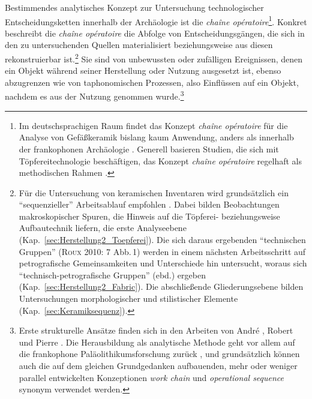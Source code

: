 \begin{multicols}{2}
Bestimmendes analytisches Konzept zur Untersuchung technologischer Entscheidungsketten innerhalb der Archäologie ist die \textit{\mbox{chaîne} opératoire}\footnote{Im deutschsprachigen Raum findet das Konzept \textit{\mbox{chaîne} opératoire} für die Analyse von Gefäßkeramik bislang kaum Anwendung, anders als innerhalb der frankophonen Archäologie \parencites[siehe][]{Gosselain.1992}{Huysecom.1994}{Visseyrais.2006}{Manem.2008}{Mayor.2011b}{Roux.2011}{Ard.2014}{Gomart.2014}. Generell basieren Studien, die sich mit Töpfereitechnologie beschäftigen, das Konzept \textit{\mbox{chaîne} opératoire} regelhaft als methodischen Rahmen \parencites[siehe][]{vanderLeeuw.1993}{PeuramakiBrown.2004}{Berg.2007}{Berg.2011}{Berg.2017}{DeLaFuente.2011}.}. Konkret beschreibt die \textit{\mbox{chaîne} opératoire} die Abfolge von Entscheidungsgängen, die sich in den zu untersuchenden Quellen materialisiert beziehungsweise aus diesen rekonstruierbar ist.\footnote{Für die Untersuchung von keramischen Inventaren wird grundsätzlich ein \enquote{sequenzieller} Arbeitsablauf empfohlen \parencites[siehe][25; 26 Abb.~4]{Ard.2014}[nach][]{Roux.2007}{Roux.2010}. Dabei bilden Beobachtungen makroskopischer Spuren, die Hinweis auf die Töpferei- beziehungsweise Aufbautechnik liefern, die erste Analyseebene (Kap.~\ref{sec:Herstellung2_Toepferei}). Die sich daraus ergebenden \enquote{technischen Gruppen} (\textsc{Roux} 2010: 7 Abb.\,1) werden in einem nächsten Arbeitsschritt auf petrografische Gemeinsamkeiten und Unterschiede hin untersucht, woraus sich \enquote{technisch-petrografische Gruppen} (ebd.) ergeben (Kap.~\ref{sec:Herstellung2_Fabric}). Die abschließende Gliederungsebene bilden Untersuchungen morphologischer und stilistischer Elemente (Kap.~\ref{sec:Keramiksequenz}).} Sie sind von unbewussten oder zufälligen Ereignissen, denen ein Objekt während seiner Herstellung oder Nutzung ausgesetzt ist, ebenso abzugrenzen wie von taphonomischen Prozessen, also Einflüssen auf ein Objekt, nachdem es aus der Nutzung genommen wurde.\footnote{Erste strukturelle Ansätze finden sich in den Arbeiten von André \textcites{LeroiGourhan.1964}{LeroiGourhan.1965}, Robert \textcites{Cresswell.1983}{Cresswell.1993} und Pierre \textcites{Lemonnier.1992}{Lemonnier.2002}. Die Herausbildung als analytische Methode geht vor allem auf die frankophone Paläolithikumsforschung zurück \parencites{Audouze.2002}[104\,f.]{BarYosef.2009}, und grundsätzlich können auch die auf dem gleichen Grundgedanken aufbauenden, mehr oder weniger parallel entwickelten Konzeptionen \textit{work chain} \parencite{Cresswell.1990} und \textit{operational sequence} \parencites {Perles.1992}{Dibble.1995}{Chazan.2003}[nach][105]{BarYosef.2009} synonym verwendet werden.}


\end{multicols}
